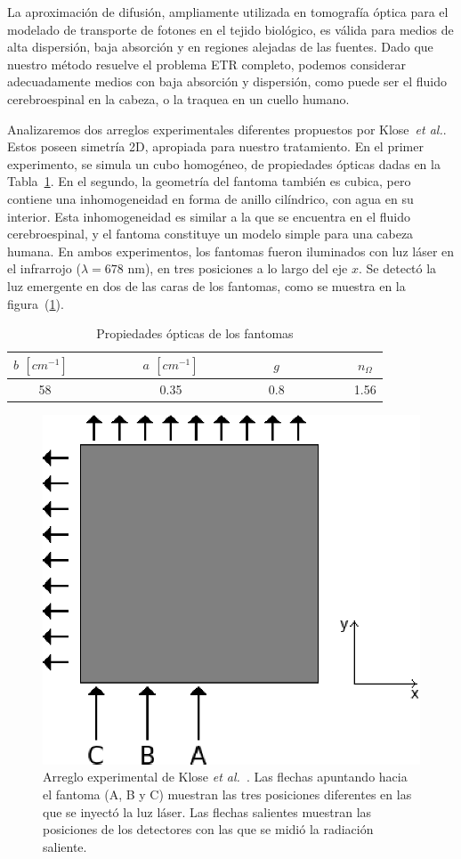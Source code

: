 La aproximación de difusión, ampliamente utilizada en tomografía óptica para el 
modelado de transporte de fotones en el tejido biológico, 
es válida para medios de alta dispersión,  
baja absorción y en regiones alejadas de las fuentes.
Dado que nuestro método resuelve el problema ETR completo, podemos considerar adecuadamente 
medios con baja absorción y dispersión, como puede ser el fluido cerebroespinal 
en la cabeza, o la traquea en un cuello humano. 

Analizaremos dos arreglos experimentales diferentes propuestos por Klose~\textit{et al.}. 
Estos poseen simetría 2D, apropiada para nuestro tratamiento. 
 En el primer experimento, se simula un cubo homogéneo, de propiedades ópticas dadas en 
 la Tabla~\ref{tab:tabopt}.
 En el segundo, la geometría del fantoma también 
 es cubica, pero contiene una inhomogeneidad en forma 
 de anillo cilíndrico, con agua en su interior. Esta inhomogeneidad 
 es similar a la que se encuentra en 
 el fluido cerebroespinal, y el fantoma constituye un modelo 
 simple para una cabeza humana. En ambos experimentos,
los fantomas fueron iluminados con luz láser en el 
infrarrojo ($\lambda = 678$ nm), en tres posiciones a lo largo del eje $x$. Se detectó la luz emergente 
en dos de las caras de los fantomas, como se muestra en la figura~(\ref{fig:phantom}).

 
 \begin{table}[h!]
\caption{Propiedades ópticas de los fantomas}
\vspace{-0.6cm}
\begin{center}
\begin{tabular}{cccc}
\hline
$b$ $[cm^{-1}]$ ~~~~~~~~ & $a$ $[cm^{-1}]$ & ~~~~~~~~ $g$  ~~~~~~~~ & $n_{\Omega}$ \\
\hline
58 ~~~~~~~~ & 0.35 & ~~~~~~~~  0.8 ~~~~~~~~ & 1.56 \\
\hline
\end{tabular}
\label{tab:tabopt}
\end{center}
\end{table}

\begin{figure}[h!]
\centering
  \includegraphics[width=0.4\linewidth]{figuras/phantom.eps}
   \caption{Arreglo experimental de Klose \textit{et al.}~\cite{Klose2002}. 
   Las flechas apuntando hacia el fantoma (A, B y C)  
   muestran las tres posiciones diferentes en las que se inyectó 
   la luz láser. Las flechas salientes muestran las posiciones de los detectores 
   con las que se midió la radiación saliente.}
 \label{fig:phantom}
\end{figure}

